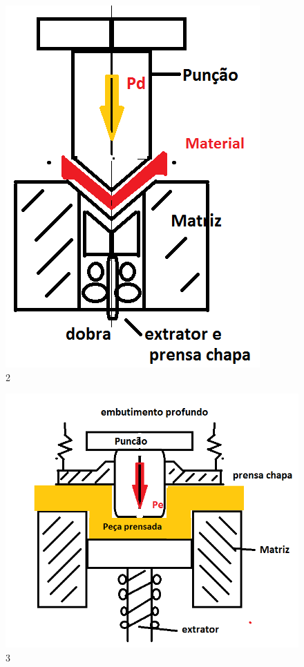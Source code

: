 \documentclass[a4paper, 12pt]{article}
\begin{document}
\begin{figure}[h]
\begin{center}
\includegraphics[scale=0.58]{./fig/2.png}
\caption{\label{fig:1}2} 
\end{center}
\end{figure}

\begin{figure}[h]
\begin{center}
\includegraphics[scale=0.48]{./fig/3.png}
\caption{\label{fig:1}3} 
\end{center}
\end{figure}
\end{document}
